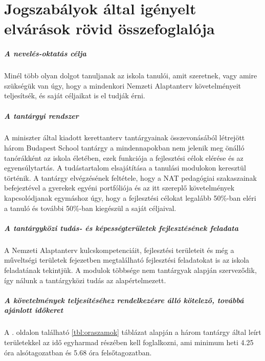 \item \chapter{Jogszabályok által igényelt elvárások rövid összefoglalója}
\paragraph{A nevelés-oktatás célja}

Minél több olyan dolgot tanuljanak az iskola tanulói, amit szeretnek, vagy amire szükségük van úgy, hogy a mindenkori Nemzeti Alaptanterv követelményeit teljesítsék, és saját céljaikat is el tudják érni.

\paragraph{A tantárgyi rendszer}

A miniszter által kiadott kerettanterv tantárgyainak összevonásából létrejött három Budapest School tantárgy a mindennapokban nem jelenik meg önálló tanórákként az iskola életében, ezek funkciója a fejlesztési célok elérése és az egyensúlytartás. A tudástartalom elsajátítása a tanulási modulokon keresztül történik. A tantárgy elvégzésének feltétele, hogy a NAT pedagógiai szakaszainak befejeztével a gyerekek egyéni portfóliója és az itt szereplő követelmények kapcsolódjanak egymáshoz úgy, hogy a fejlesztési célokat legalább 50\%-ban eléri a tanuló és további 50\%-ban kiegészül a saját céljaival.

\paragraph{A tantárgyközi tudás- és képességterületek fejlesztésének feladata}

A Nemzeti Alaptanterv kulcskompetenciáit, fejlesztési területeit és még a műveltségi területek fejezetben megtalálható fejlesztési feladatokat is az iskola feladatának tekintjük. A modulok többsége nem tantárgyak alapján szerveződik, így nálunk a tantárgyközi tudás az alapértelmezett.

\paragraph{A követelmények teljesítéséhez rendelkezésre álló kötelező, továbbá ajánlott időkeret}

A \pageref{tbl:oraszamok}. oldalon található \ref{tbl:oraszamok} táblázat alapján a három tantárgy által leírt területekkel az idő egyharmad részében kell foglalkozni, ami minimum heti 4.25 óra alsótagozatban és 5.68 óra felsőtagozatban.

